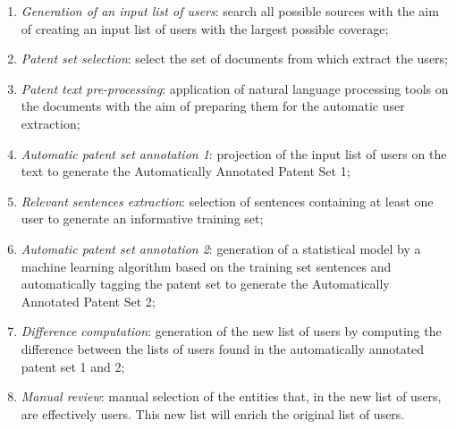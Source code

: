 \documentclass[b5paper,]{book}
\theoremstyle{definition}
\theoremstyle{definition}
\theoremstyle{definition}
\theoremstyle{remark}
\begin{document}
\begin{enumerate}
\def\labelenumi{\arabic{enumi}.}
\item
  \emph{Generation of an input list of users}: search all possible
  sources with the aim of creating an input list of users with the
  largest possible coverage;
\item
  \emph{Patent set selection}: select the set of documents from which
  extract the users;
\item
  \emph{Patent text pre-processing}: application of natural language
  processing tools on the documents with the aim of preparing them for
  the automatic user extraction;
\item
  \emph{Automatic patent set annotation 1}: projection of the input list
  of users on the text to generate the Automatically Annotated Patent
  Set 1;
\item
  \emph{Relevant sentences extraction}: selection of sentences
  containing at least one user to generate an informative training set;
\item
  \emph{Automatic patent set annotation 2}: generation of a statistical
  model by a machine learning algorithm based on the training set
  sentences and automatically tagging the patent set to generate the
  Automatically Annotated Patent Set 2;
\item
  \emph{Difference computation}: generation of the new list of users by
  computing the difference between the lists of users found in the
  automatically annotated patent set 1 and 2;
\item
  \emph{Manual review}: manual selection of the entities that, in the
  new list of users, are effectively users. This new list will enrich
  the original list of users.
\end{enumerate}
\end{document}

